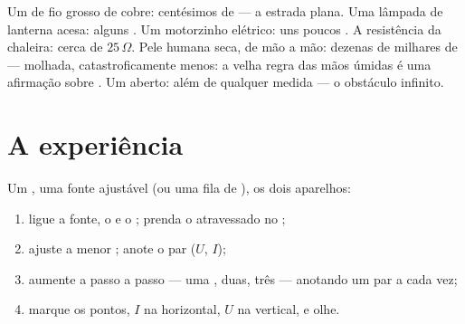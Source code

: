 \begin{example}\label{ex:g8:ohms-law:values}
Um  de fio grosso de cobre: centésimos de  --- a estrada
plana. Uma lâmpada de lanterna acesa: alguns . Um motorzinho
elétrico: uns poucos . A resistência da chaleira: cerca de
$25\,\Omega$. Pele humana seca, de mão a mão: dezenas de milhares de
 --- molhada, catastroficamente menos: a velha regra das mãos
úmidas é uma afirmação sobre . Um  aberto:
 além de qualquer medida --- o obstáculo infinito.
\end{example}

\section{A experiência}

\begin{method}\label{met:g8:ohms-law:portrait}
Um , uma fonte ajustável (ou uma fila  de ), os
dois aparelhos:
\begin{enumerate}
  \item ligue a fonte, o  e o  ; prenda o
         atravessado no ;
  \item ajuste a menor ; anote o par ($U$, $I$);
  \item aumente a  passo a passo --- uma , duas, três ---
        anotando um par a cada vez;
  \item marque os pontos, $I$ na horizontal, $U$ na vertical, e
        olhe.
\end{enumerate}
\end{method}

